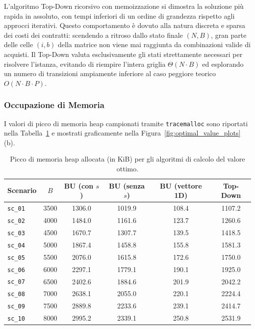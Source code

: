 L'algoritmo Top-Down ricorsivo con memoizzazione si dimostra la soluzione più rapida in assoluto, con tempi inferiori di un ordine di grandezza rispetto agli approcci iterativi. Questo comportamento è dovuto alla natura discreta e sparsa dei costi dei contratti: scendendo a ritroso dallo stato finale $(N, B)$, gran parte delle celle $(i, b)$ della matrice non viene mai raggiunta da combinazioni valide di acquisti. Il Top-Down valuta esclusivamente gli stati strettamente necessari per risolvere l'istanza, evitando di riempire l'intera griglia $\Theta(N \cdot B)$ ed esplorando un numero di transizioni ampiamente inferiore al caso peggiore teorico $O(N \cdot B \cdot P)$.

\subsubsection{Occupazione di Memoria}
I valori di picco di memoria heap campionati tramite \texttt{tracemalloc} sono riportati nella Tabella~\ref{tab:memory_consumption} e mostrati graficamente nella Figura~\ref{fig:optimal_value_plots}(b).

\begin{table}[!htbp]
	\centering
	\small
	\caption{Picco di memoria heap allocata (in KiB) per gli algoritmi di calcolo del valore ottimo.}
	\label{tab:memory_consumption}
	\begin{tabular}{lccccc}
		\toprule
		\textbf{Scenario} & $B$ & \textbf{BU (con $s$)} & \textbf{BU (senza $s$)} & \textbf{BU (vettore 1D)} & \textbf{Top-Down} \\
		\midrule
		\texttt{sc\_01} & 3500 & 1306.0 & 1019.9 & 108.4 & 1107.2 \\
		\texttt{sc\_02} & 4000 & 1484.0 & 1161.6 & 123.7 & 1260.6 \\
		\texttt{sc\_03} & 4500 & 1670.7 & 1307.7 & 139.5 & 1418.5 \\
		\texttt{sc\_04} & 5000 & 1867.4 & 1458.8 & 155.8 & 1581.3 \\
		\texttt{sc\_05} & 5500 & 2076.0 & 1615.8 & 172.6 & 1750.0 \\
		\texttt{sc\_06} & 6000 & 2297.1 & 1779.1 & 190.1 & 1925.0 \\
		\texttt{sc\_07} & 6500 & 2402.6 & 1884.6 & 201.9 & 2042.2 \\
		\texttt{sc\_08} & 7000 & 2638.1 & 2055.0 & 220.1 & 2224.4 \\
		\texttt{sc\_09} & 7500 & 2889.8 & 2233.6 & 239.1 & 2414.7 \\
		\texttt{sc\_10} & 8000 & 2995.2 & 2339.1 & 250.8 & 2531.9 \\
		\bottomrule
	\end{tabular}
\end{table}

